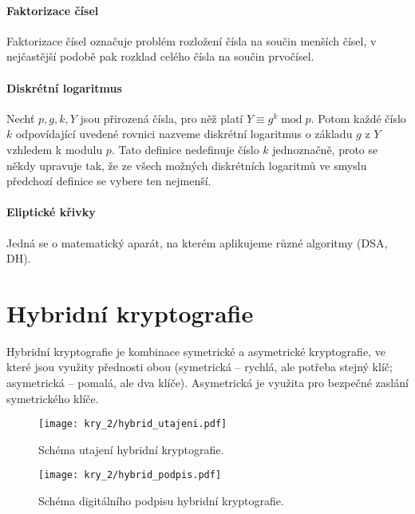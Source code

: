 \paragraph*{Faktorizace čísel} Faktorizace čísel označuje problém rozložení čísla na součin menších čísel, v nejčastější podobě pak rozklad celého čísla na součin prvočísel.

\paragraph*{Diskrétní logaritmus} Nechť $p, g, k, Y$ jsou přirozená čísla, pro něž platí $Y \equiv g^{k} \; \text{mod} \; p$. Potom každé číslo $k$ odpovídající uvedené rovnici nazveme diskrétní logaritmus o základu $g$ z $Y$ vzhledem k modulu $p$. Tato definice nedefinuje číslo $k$ jednoznačně, proto se někdy upravuje tak, že ze všech možných diskrétních logaritmů ve smyslu předchozí definice se vybere ten nejmenší.

\paragraph*{Eliptické křivky} Jedná se o matematický aparát, na kterém aplikujeme různé algoritmy (DSA, DH).


\section{Hybridní kryptografie}

Hybridní kryptografie je kombinace symetrické a asymetrické kryptografie, ve které jsou využity přednosti obou (symetrická -- rychlá, ale potřeba stejný klíč; asymetrická -- pomalá, ale dva klíče). Asymetrická je využita pro bezpečné zaslání symetrického klíče.

\begin{figure}[H]
    \centering
    \texttt{[image: kry\_2/hybrid\_utajeni.pdf]}
    \caption{Schéma utajení hybridní kryptografie.}
\end{figure}

\begin{figure}[H]
    \centering
    \texttt{[image: kry\_2/hybrid\_podpis.pdf]}
    \caption{Schéma digitálního podpisu hybridní kryptografie.}
\end{figure}


